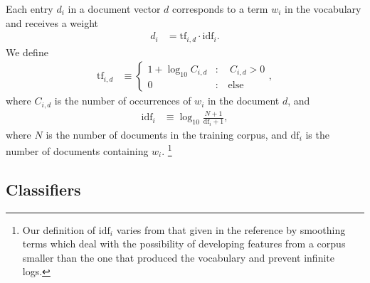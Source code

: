 \documentclass{article}
\begin{document}
Each entry $d_i$ in a document vector $d$ corresponds to a term $w_i$ in the vocabulary and receives a weight
%
\begin{align}
  d_i &= \mathrm{tf}_{i,d} \cdot \mathrm{idf}_{i}.
\end{align}
%
We define
%
\begin{align}
  \mathrm{tf}_{i,d} &\equiv \begin{cases}
                         1 + \log_{10}C_{i,d} &:\quad C_{i,d} > 0\\
                         0 &:\quad\text{else}
                       \end{cases},
\end{align}
%
where $C_{i,d}$ is the number of occurrences of $w_i$ in the document $d$, and
%
\begin{align}
  \mathrm{idf}_i &\equiv \log_{10} \frac{N+1}{\mathrm{df}_i + 1},
\end{align}
%
where $N$ is the number of documents in the training corpus, and $\mathrm{df}_i$ is the number of documents containing $w_i$.
%
\footnote{Our definition of $\mathrm{idf}_i$ varies from that given in the reference by smoothing terms which deal with the possibility of developing features from a corpus smaller than the one that produced the vocabulary and prevent infinite logs.}















\subsection{Classifiers}
\end{document}
